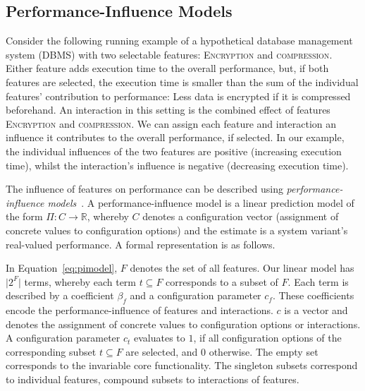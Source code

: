 \documentclass[sigconf]{acmart}
\begin{document}
	\subsection{Performance-Influence Models}\label{sec:pimodels}
	Consider the following running example of a hypothetical database management system (DBMS) with two selectable features: \textsc{Encryption} and \textsc{compression}.
	Either feature adds execution time to the overall performance, but, if both features are selected, the execution time is smaller than the sum of the individual features' contribution to performance: Less data is encrypted if it is compressed beforehand.
	An interaction in this setting is the combined effect of features \textsc{Encryption} and \textsc{compression}.
	We can assign each feature and interaction an influence it contributes to the overall performance, if selected. In our example, the individual influences of the two features are positive (increasing execution time), whilst the interaction's influence is negative (decreasing execution time).

	The influence of features on performance can be described using \emph{performance-influence models}~\cite{siegmundPerformanceinfluenceModelsHighly2015}.
	A performance-influence model is a linear prediction model of the form $\Pi:C\rightarrow \mathbb{R}$, whereby $C$ denotes a configuration vector (assignment of concrete values to configuration options) and the estimate is a system variant's real-valued performance.
	A formal representation is as follows.

	In Equation~\ref{eq:pimodel}, $F$ denotes the set of all features. Our linear model has $\vert 2^F\vert$ terms, whereby each term $t \subseteq F$ corresponds to a subset of $F$. Each term is described by a coefficient $\beta_f$ and a configuration parameter $c_f$.
	These coefficients encode the performance-influence of features and interactions. $c$ is a vector and denotes the assignment of concrete values to configuration options or interactions. A configuration parameter $c_t$ evaluates to $1$, if all configuration options of the corresponding subset $t \subseteq F$ are selected, and $0$ otherwise. The empty set corresponds to the invariable core functionality. The singleton subsets correspond to individual features, compound subsets to interactions of features.
\end{document}
